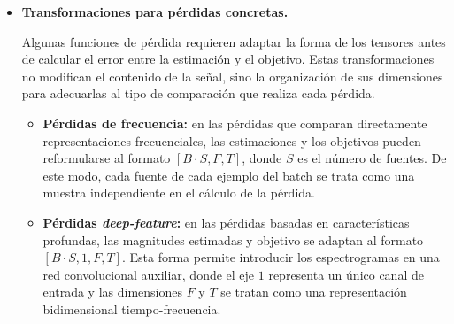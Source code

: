 \begin{itemize}
\begin{itemize}
        \item \textbf{BatchNorm:} la normalización por lotes normaliza las activaciones utilizando estadísticas calculadas sobre el batch. En este trabajo se aplica después de la conversión a decibelios y antes de la LSTM, con el objetivo de estabilizar el entrenamiento y facilitar la convergencia del modelo.

        \item \textbf{Reordenación dimensional:} las operaciones de carga de datos, cálculo de STFT y procesamiento con redes recurrentes pueden requerir distintas ordenaciones de los ejes del tensor. Por ello, antes de introducir los datos en la LSTM, la magnitud se adapta al formato \([B,T,F]\). De esta forma, el espectrograma se interpreta como una secuencia temporal de vectores frecuenciales.
    \end{itemize}

    La LSTM procesa esta secuencia temporal y produce una representación a partir de la cual se estiman máscaras tiempo-frecuencia para cada fuente. Estas máscaras se aplican sobre la magnitud de la mezcla para obtener las magnitudes estimadas de los distintos \textit{stems}.

    \item \textbf{Transformaciones para pérdidas concretas.}

    Algunas funciones de pérdida requieren adaptar la forma de los tensores antes de calcular el error entre la estimación y el objetivo. Estas transformaciones no modifican el contenido de la señal, sino la organización de sus dimensiones para adecuarlas al tipo de comparación que realiza cada pérdida.

    \begin{itemize}
        \item \textbf{Pérdidas de frecuencia:} en las pérdidas que comparan directamente representaciones frecuenciales, las estimaciones y los objetivos pueden reformularse al formato \([B \cdot S, F, T]\), donde \(S\) es el número de fuentes. De este modo, cada fuente de cada ejemplo del batch se trata como una muestra independiente en el cálculo de la pérdida.

        \item \textbf{Pérdidas \textit{deep-feature}:} en las pérdidas basadas en características profundas, las magnitudes estimadas y objetivo se adaptan al formato \([B \cdot S, 1, F, T]\). Esta forma permite introducir los espectrogramas en una red convolucional auxiliar, donde el eje \(1\) representa un único canal de entrada y las dimensiones \(F\) y \(T\) se tratan como una representación bidimensional tiempo-frecuencia.
    \end{itemize}

\end{itemize}
